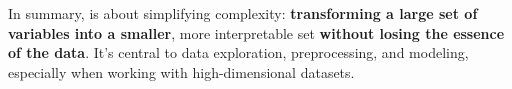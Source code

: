 \highspace
In summary,  is about simplifying complexity: \textbf{transforming a large set of variables into a smaller}, more interpretable set \textbf{without losing the essence of the data}. It's central to data exploration, preprocessing, and modeling, especially when working with high-dimensional datasets.